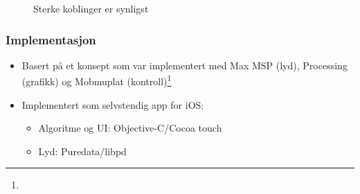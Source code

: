 \documentclass{beamer}
\begin{document}
\begin{frame}[allowframebreaks]
\begin{figure}
		\caption{Sterke koblinger er synligst}
	\end{figure}
\end{frame}

\begin{frame}
	\frametitle{Implementasjon}
	\begin{itemize}[<+->]
		\item Basert på et konsept som var implementert med Max MSP (lyd), Processing (grafikk) og Mobmuplat (kontroll)\footnote{}
		\item Implementert som selvstendig app for iOS:
		\begin{itemize}
			\item Algoritme og UI: Objective-C/Cocoa touch
			\item Lyd: Puredata/libpd
		\end{itemize}
	\end{itemize}
\end{frame}
\end{document}
